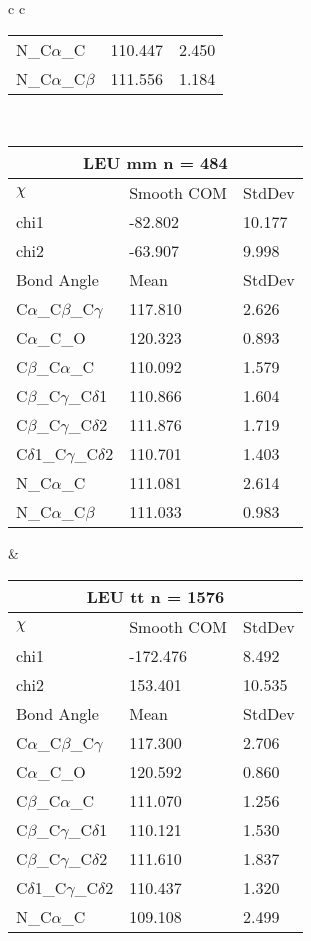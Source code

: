 \begin{longtable}{ c c }
\begin{tabular}{ l l l }
  N\_C$\alpha$\_C & 110.447 & 2.450\\
  N\_C$\alpha$\_C$\beta$ & 111.556 & 1.184\\
  \bottomrule
  \end{tabular}
  \\
  \begin{tabular}{ l l l }
  \toprule
  \multicolumn{3}{c}{LEU \textbf{mm} n = 484} \\ \toprule
  $\chi$       & Smooth COM & StdDev \\ \midrule
  chi1 & -82.802 & 10.177 \\ 
  chi2 & -63.907 & 9.998 \\ \midrule
  Bond Angle   & Mean     & StdDev \\ \midrule
  C$\alpha$\_C$\beta$\_C$\gamma$ & 117.810 & 2.626\\
  C$\alpha$\_C\_O & 120.323 & 0.893\\
  C$\beta$\_C$\alpha$\_C & 110.092 & 1.579\\
  C$\beta$\_C$\gamma$\_C$\delta$1 & 110.866 & 1.604\\
  C$\beta$\_C$\gamma$\_C$\delta$2 & 111.876 & 1.719\\
  C$\delta$1\_C$\gamma$\_C$\delta$2 & 110.701 & 1.403\\
  N\_C$\alpha$\_C & 111.081 & 2.614\\
  N\_C$\alpha$\_C$\beta$ & 111.033 & 0.983\\
  \bottomrule
  \end{tabular}
  &
  \begin{tabular}{ l l l }
  \toprule
  \multicolumn{3}{c}{LEU \textbf{tt} n = 1576} \\ \toprule
  $\chi$       & Smooth COM & StdDev \\ \midrule
  chi1 & -172.476 & 8.492 \\ 
  chi2 & 153.401 & 10.535 \\ \midrule
  Bond Angle   & Mean     & StdDev \\ \midrule
  C$\alpha$\_C$\beta$\_C$\gamma$ & 117.300 & 2.706\\
  C$\alpha$\_C\_O & 120.592 & 0.860\\
  C$\beta$\_C$\alpha$\_C & 111.070 & 1.256\\
  C$\beta$\_C$\gamma$\_C$\delta$1 & 110.121 & 1.530\\
  C$\beta$\_C$\gamma$\_C$\delta$2 & 111.610 & 1.837\\
  C$\delta$1\_C$\gamma$\_C$\delta$2 & 110.437 & 1.320\\
  N\_C$\alpha$\_C & 109.108 & 2.499\\

\end{tabular}
\end{longtable}
